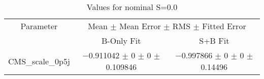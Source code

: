 \begin{table}
\centering
\caption{Values for nominal S=0.0}
\begin{tabular}{ccc}
\toprule
Parameter & \multicolumn{2}{c}{Mean $\pm$ Mean Error $\pm$ RMS $\pm$ Fitted Error}\\
 & B-Only Fit & S+B Fit\\
\midrule
CMS\_scale\_0p5j & \num{-0.911042} $\pm$ \num{0} $\pm$ \num{0} $\pm$ \num{0.109846} & \num{-0.997866} $\pm$ \num{0} $\pm$ \num{0} $\pm$ \num{0.14496}\\
\bottomrule
\end{tabular}
\end{table}
